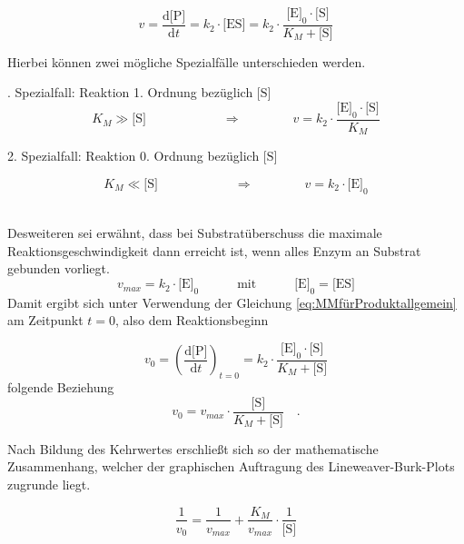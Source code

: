 \begin{equation}
v=\frac{\text{d[P]}}{\text{d}t}=k_2\cdot\text{[ES]} =k_2\cdot \frac{\text{[E]}_0\cdot\text{[S]}}{K_M+\text{[S]}}
\label{eq:MMfürProduktallgemein}
\end{equation}


Hierbei können zwei mögliche Spezialfälle unterschieden werden.
\\
\par
\begingroup
\leftskip=1cm %
. Spezialfall: Reaktion 1. Ordnung bezüglich $\text{[S]}$
\begin{equation}
K_M \gg \text{[S]}\quad\quad\quad\quad\quad\quad \Longrightarrow \quad\quad\quad\quad v=k_2\cdot \frac{\text{[E]}_0\cdot\text{[S]}}{K_M}
\end{equation}

2. Spezialfall: Reaktion 0. Ordnung bezüglich $\text{[S]}$

\begin{equation}
K_M \ll \text{[S]}\quad\quad\quad\quad\quad\quad \Longrightarrow \quad\quad\quad\quad v=k_2\cdot \text{[E]}_0
\label{eq:Grenzfall}
\end{equation}
\\
\par
\endgroup
Desweiteren sei erwähnt, dass bei Substratüberschuss die maximale Reaktionsgeschwindigkeit dann erreicht ist, wenn alles Enzym an Substrat gebunden vorliegt.
\begin{equation}
v_{max}=k_2\cdot\text{[E]}_0\quad\quad\quad \text{mit}\quad\quad\quad\text{[E]}_0=\text{[ES]}
\label{eq:vmaxmitk2}
\end{equation}
Damit ergibt sich unter Verwendung der Gleichung \ref{eq:MMfürProduktallgemein} 
am Zeitpunkt $t=0$, also dem Reaktionsbeginn 

\begin{equation}
v_0=\left(\frac{\text{d[P]}}{\text{d}t}\right)_{t=0}=k_2\cdot \frac{\text{[E]}_0\cdot\text{[S]}}{K_M+\text{[S]}}
\label{eq:MMfürProduktbeinull}
\end{equation}
 folgende Beziehung
\begin{equation}
v_0=v_{max}\cdot \frac{\text{[S]}}{K_M+\text{[S]}}\quad\text{.}
\end{equation}

Nach Bildung des Kehrwertes erschließt sich so der mathematische Zusammenhang, welcher der graphischen Auftragung des Lineweaver-Burk-Plots zugrunde liegt.

\begin{equation}
\frac{1}{v_{0}}=\frac{1}{v_{max}}+\frac{K_M}{v_{max}}\cdot \frac{1}{\text{[S]}}
\label{eq:lineweaverPlot}
\end{equation}
